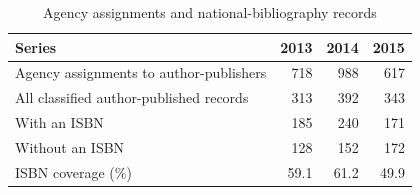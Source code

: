 \begin{table}[htbp]\centering\small
\caption{Agency assignments and national-bibliography records}\label{tab:counts}
\begin{tabular}{lrrr}\toprule
Series & 2013 & 2014 & 2015\\\midrule
Agency assignments to author-publishers & 718 & 988 & 617\\
All classified author-published records & 313 & 392 & 343\\
With an ISBN & 185 & 240 & 171\\
Without an ISBN & 128 & 152 & 172\\
ISBN coverage (\%) & 59.1 & 61.2 & 49.9\\
\bottomrule\end{tabular}
\end{table}
